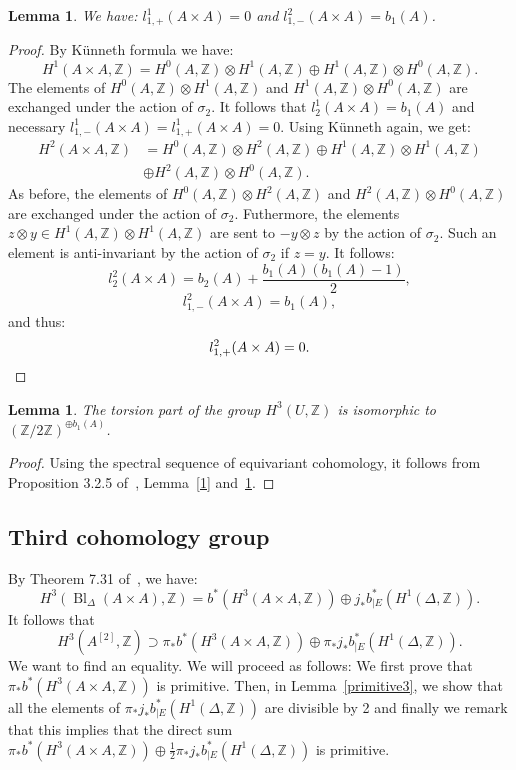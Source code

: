 \documentclass{alggeom}
\DeclareMathOperator{\Bl}{Bl}
\newcommand{\Z}{\mathbb{Z}}
\theoremstyle{plain}
\newtheorem{lemma}[theorem]{Lemma}
\theoremstyle{definition}
\theoremstyle{remark}
\begin{document}
\begin{lemma}\label{2}
We have: $l_{1,+}^{1}(A\times A)=0$ and $l_{1,-}^{2}(A\times A)=b_1(A)$.
\end{lemma}
\begin{proof}
By K\"unneth formula we have:
$$H^{1}(A\times A,\Z)=H^{0}(A,\Z)\otimes H^{1}(A,\Z)\oplus H^{1}(A,\Z)\otimes H^{0}(A,\Z).$$
The elements of $H^{0}(A,\Z)\otimes H^{1}(A,\Z)$ and $H^{1}(A,\Z)\otimes H^{0}(A,\Z)$ are exchanged under the action of $\sigma_2$. It follows that $l_{2}^{1}(A\times A)=b_1(A)$ and necessary $l_{1,-}^{1}(A\times A)=l_{1,+}^{1}(A\times A)=0$.
Using K\"unneth again, we get: 
\begin{align*}
H^{2}(A\times A,\Z)&=H^{0}(A,\Z)\otimes H^{2}(A,\Z)\oplus H^{1}(A,\Z)\otimes H^{1}(A,\Z)\\
&\oplus H^{2}(A,\Z)\otimes H^{0}(A,\Z).
\end{align*}
As before, the elements of $H^{0}(A,\Z)\otimes H^{2}(A,\Z)$ and $H^{2}(A,\Z)\otimes H^{0}(A,\Z)$ are exchanged under the action of $\sigma_2$.
Futhermore, the elements $z\otimes y\in H^{1}(A,\Z)\otimes H^{1}(A,\Z)$ are sent to $-y\otimes z$ by the action of $\sigma_2$. Such an element is anti-invariant by the action of $\sigma_2$ if $z=y$. It follows:
$$l_{2}^{2}(A\times A)=b_2(A)+\frac{b_1(A)(b_1(A)-1)}{2},$$
$$l_{1,-}^{2}(A\times A)=b_1(A),$$
and thus:
\begin{equation*}
l_{1,+}^{2}(A\times A)=0.
\qedhere
\end{equation*}
\end{proof}
\begin{lemma}\label{3}
The torsion part of the group $H^{3}(U,\Z)$ is isomorphic to $(\Z/2\Z)^{\oplus b_1(A)}$.
\end{lemma}
\begin{proof}
Using the spectral sequence of equivariant cohomology, it follows from Proposition 3.2.5 of~\cite{Lol}, Lemma~\ref{1} and~\ref{2}.
\end{proof}
\subsection{Third cohomology group}\label{=}
By Theorem 7.31 of~\cite{Voisin}, we have:
\begin{equation}
H^{3}(\Bl_\Delta(A\! \times\! A),\Z)=b^{*}(H^{3}(A\times A,\Z))\oplus j_*b_{|E}^{*}(H^{1}(\Delta,\Z)).
\label{voisin1}
\end{equation}
It follows that $$H^{3}(A^{[2]},\Z)\supset \pi_{*}b^{*}(H^{3}(A\times A,\Z))\oplus \pi_{*}j_*b_{|E}^{*}(H^{1}(\Delta,\Z)).$$
We want to find an equality. We will proceed as follows: We first prove that $\pi_{*}b^{*}(H^{3}(A\times A,\Z))$ is primitive. Then, in Lemma~\ref{primitive3}, we show that all the elements of $\pi_{*}j_*b_{|E}^{*}(H^{1}(\Delta,\Z))$ are divisible by 2 and finally we remark that this implies that the direct sum $\pi_*b^{*}(H^{3}(A\times A,\Z))\oplus \frac{1}{2}\pi_*j_*b_{|E}^{*}(H^{1}(\Delta,\Z))$ is primitive.  
\end{document}
